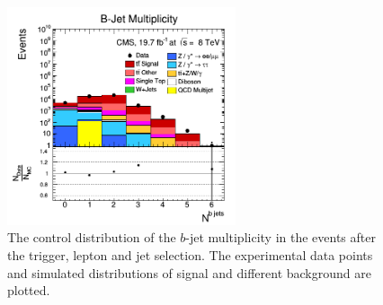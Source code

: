 \begin{itemize}
 \begin{figure}[h]
  \centering
  \includegraphics[width=0.6\textwidth]{04_event_reconstruction/plots/bJetMulti.png}
  \caption{The control distribution of the $b$-jet multiplicity in the events after the trigger, lepton and jet selection. The experimental data points
  and simulated distributions of signal and different background are plotted.}
  \label{fig:bjetMultiSel}
  \end{figure}
  

\end{itemize}
